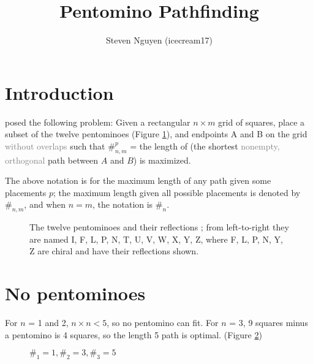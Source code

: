 \documentclass{article}
\title{Pentomino Pathfinding}
\author{Steven Nguyen (icecream17)}
\theoremstyle{definition}%
\newcommand{\minordetail}[1]{\textcolor{gray}{#1}}
\begin{document}
\maketitle


\tableofcontents





\section{Introduction}

\cite{v1} posed the following problem: Given a rectangular $n \times m$ grid of squares, place a subset of the twelve pentominoes (Figure \ref{fig:pentominoes}), and endpoints A and B on the grid \minordetail{without overlaps} such that $\#^{p}_{n, m}$ = the length of (the shortest \minordetail{nonempty, orthogonal} path between $A$ and $B$) is maximized.

The above notation is for the maximum length of any path given some placements $p$; the maximum length given all possible placements is denoted by $\#_{n, m}$, and when $n = m$, the notation is $\#_n$.

\begin{figure}[htbp]
    \centering
    
    \caption{The twelve pentominoes and their reflections \cite{pentominoes};
    from left-to-right they are named I, F, L, P, N, T, U, V, W, X, Y, Z,
    where F, L, P, N, Y, Z are chiral and have their reflections shown.}
    \label{fig:pentominoes}
\end{figure}






\section{No pentominoes}

For $n$ = 1 and 2, $n \times n < 5$, so no pentomino can fit.
For $n$ = 3, 9 squares minus a pentomino is 4 squares, so the length 5 path is optimal. (Figure \ref{fig:no123})

\begin{figure}[htbp]
    \centering
    \caption{$\#_1 = 1, \#_2 = 3, \#_3 = 5$ \cite{v1}}
    \label{fig:no123}
\end{figure}
\end{document}
